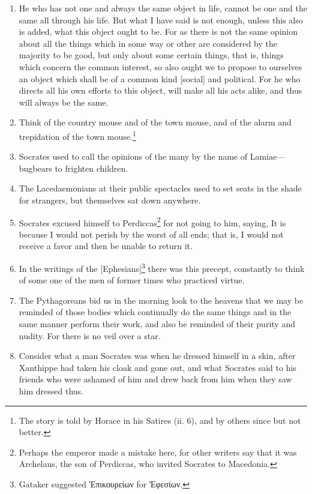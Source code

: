 \begin{enumerate}
\item He who has not one and always the same object in life, cannot be one and the same all through his life. But what I have said is not enough, unless this also is added, what this object ought to be. For as there is not the same opinion about all the things which in some way or other are considered by the majority to be good, but only about some certain things, that is, things which concern the common interest, so also ought we to propose to ourselves an object which shall be of a common kind [{\clarify social}] and political. For he who directs all his own efforts to this object, will make all his acts alike, and thus will always be the same.

\item Think of the country mouse and of the town mouse, and of the alarm and trepidation of the town mouse.\footnote{The story is told by Horace in his Satires (ii. 6), and by others since but not better.}

\item Socrates used to call the opinions of the many by the name of Lamiae—bugbears to frighten children.

\item The Lacedaemonians at their public spectacles used to set seats in the shade for strangers, but themselves sat down anywhere.

\item Socrates excused himself to Perdiccas\footnote{Perhaps the emperor made a mistake here, for other writers say that it was Archelaus, the son of Perdiccas, who invited Socrates to Macedonia.} for not going to him, saying, It is because I would not perish by the worst of all ends; that is, I would not receive a favor and then be unable to return it.

\item In the writings of the [{\clarify Ephesians}]\footnote{Gataker suggested \textgreek{Ἐπικουρείων} for \textgreek{Ἐφεσίων}.} there was this precept, constantly to think of some one of the men of former times who practiced virtue.

\item The Pythagoreans bid us in the morning look to the heavens that we may be reminded of those bodies which continually do the same things and in the same manner perform their work, and also be reminded of their purity and nudity. For there is no veil over a star.

\item Consider what a man Socrates was when he dressed himself in a skin, after Xanthippe had taken his cloak and gone out, and what Socrates said to his friends who were ashamed of him and drew back from him when they saw him dressed thus.


\end{enumerate}
